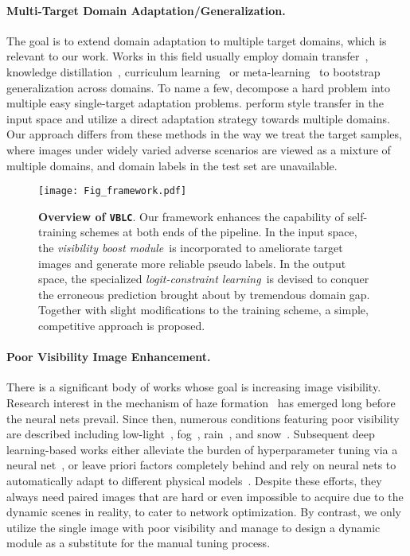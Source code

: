 \documentclass[letterpaper]{article} \usepackage{aaai23}  \usepackage{times}  \usepackage{helvet}  \usepackage{courier}  \usepackage[hyphens]{url}  \usepackage{graphicx} \urlstyle{rm} \def\UrlFont{\rm}  \usepackage{natbib}  \usepackage{caption} \frenchspacing  \setlength{\pdfpagewidth}{8.5in}  \setlength{\pdfpageheight}{11in}  \usepackage{algorithm}
\newcommand{\methodblank}{\texttt{VBLC}}
\newcommand{\boostModuleName}{\textit{visibility boost module}}
\newcommand{\lossModuleName}{\textit{logit-constraint learning}}
\begin{document}
\paragraph{Multi-Target Domain Adaptation/Generalization.} The goal is to extend domain adaptation to multiple target domains, which is relevant to our work.
Works in this field usually employ domain transfer~\cite{lee2022adas}, knowledge distillation~\cite{isobe2021multi}, curriculum learning~\cite{liu2020ocda} or meta-learning~\cite{GongCPLCLDG21} to bootstrap generalization across domains. To name a few, \citet{ParkWSK20} decompose a hard problem into multiple easy single-target adaptation problems. 
\citet{lee2022adas} perform style transfer in the input space and utilize a direct adaptation strategy towards multiple domains.  
Our approach differs from these methods in the way we treat the target samples, where images under widely varied adverse scenarios are viewed as a mixture of multiple domains, and domain labels in the test set are unavailable.

\begin{figure*}[t]
    \centering
    \texttt{[image: Fig\_framework.pdf]}
    \caption{{\bf Overview of \methodblank}. Our framework enhances the capability of self-training schemes at both ends of the pipeline. In the input space, the \boostModuleName~is incorporated to ameliorate target images and generate more reliable pseudo labels. In the output space, the specialized \lossModuleName~is devised to conquer the erroneous prediction brought about by tremendous domain gap. Together with slight modifications to the training scheme, a simple, competitive approach is proposed.}
    \label{fig:framework}
\end{figure*}

\paragraph{Poor Visibility Image Enhancement.} There is a significant body of works whose goal is increasing image visibility.
Research interest in the mechanism of haze formation~\cite{mccartney1976optics} has emerged long before the neural nets prevail. Since then, numerous conditions featuring poor visibility are described including low-light~\cite{land1977retinex}, fog~\cite{narasimhan2003contrast}, rain~\cite{li2019heavy}, and snow~\cite{chen2020jstasr}. 
Subsequent deep learning-based works either alleviate the burden of hyperparameter tuning via a neural net~\cite{liu2022image}, or leave priori factors completely behind and rely on neural nets to automatically adapt to different physical models~\cite{valanarasu2022transweather}. Despite these efforts, they always need paired images that are hard or even impossible to acquire due to the dynamic scenes in reality, to cater to network optimization. By contrast, we only utilize the single image with poor visibility and manage to design a dynamic module as a substitute for the manual tuning process.
\end{document}
